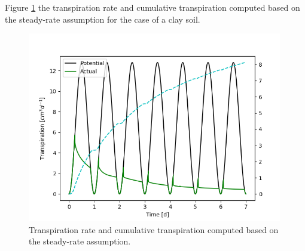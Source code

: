 Figure \ref{fig:schroeder} the transpiration rate and cumulative transpiration computed based on the steady-rate assumption for the case of a clay soil. 
%
\begin{figure}
\includegraphics[width=0.99\textwidth]{clay_schroeder.png}
\caption{Transpiration rate and cumulative transpiration computed based on the steady-rate assumption.} \label{fig:schroeder}
\end{figure}





